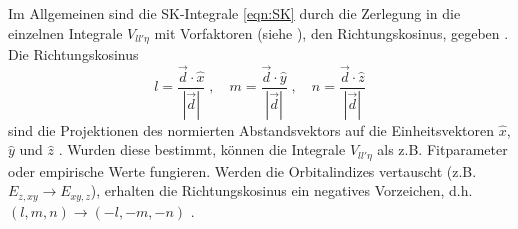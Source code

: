 Im Allgemeinen sind die SK-Integrale \eqref{eqn:SK} durch die Zerlegung in die einzelnen Integrale $V_{ll'\eta}$ mit Vorfaktoren (siehe \cite{PhysRev.94.1498}),
den Richtungskosinus, gegeben \cite{SC_literature}.
Die Richtungskosinus 
\begin{equation}
    l = \frac{\vec{d} \cdot \hat{x}}{\left | \vec{d} \right |} \; , \quad
    m = \frac{\vec{d} \cdot \hat{y}}{\left | \vec{d} \right |} \; , \quad
    n = \frac{\vec{d} \cdot \hat{z}}{\left | \vec{d} \right |} \label{eqn:RK}
\end{equation}
sind die Projektionen des normierten Abstandsvektors auf die Einheitsvektoren $\hat{x}$, $\hat{y}$ und $\hat{z}$ \cite{SC_literature}.
Wurden diese bestimmt, können die Integrale $V_{ll'\eta}$ als z.B. Fitparameter oder empirische Werte fungieren. 
Werden die Orbitalindizes vertauscht (z.B. $E_{z,xy} \to E_{xy, z}$), erhalten die Richtungskosinus ein negatives Vorzeichen, d.h. $(l,m,n) \to (-l,-m,-n)$ \cite{PhysRev.94.1498}.